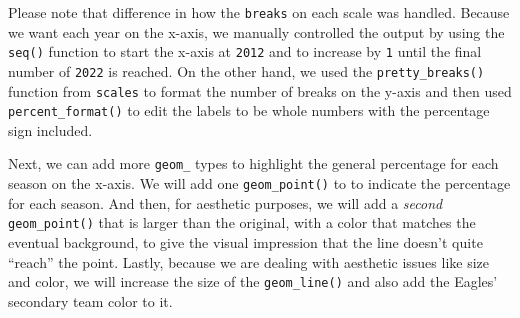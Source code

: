 \documentclass[
  letterpaper,
]{krantz}
\newenvironment{Shaded}{\begin{snugshade}}{\end{snugshade}}
\newcommand{\AttributeTok}[1]{\textcolor[rgb]{0.40,0.45,0.13}{#1}}
\newcommand{\DecValTok}[1]{\textcolor[rgb]{0.68,0.00,0.00}{#1}}
\newcommand{\FunctionTok}[1]{\textcolor[rgb]{0.28,0.35,0.67}{#1}}
\newcommand{\NormalTok}[1]{\textcolor[rgb]{0.00,0.23,0.31}{#1}}
\newcommand{\SpecialCharTok}[1]{\textcolor[rgb]{0.37,0.37,0.37}{#1}}
\newcommand{\StringTok}[1]{\textcolor[rgb]{0.13,0.47,0.30}{#1}}
\begin{document}
Please note that difference in how the \texttt{breaks} on each scale was
handled. Because we want each year on the x-axis, we manually controlled
the output by using the \texttt{seq()} function to start the x-axis at
\texttt{2012} and to increase by \texttt{1} until the final number of
\texttt{2022} is reached. On the other hand, we used the
\texttt{pretty\_breaks()} function from \texttt{scales} to format the
number of breaks on the y-axis and then used \texttt{percent\_format()}
to edit the labels to be whole numbers with the percentage sign
included.

Next, we can add more \texttt{geom\_} types to highlight the general
percentage for each season on the x-axis. We will add one
\texttt{geom\_point()} to to indicate the percentage for each season.
And then, for aesthetic purposes, we will add a \emph{second}
\texttt{geom\_point()} that is larger than the original, with a color
that matches the eventual background, to give the visual impression that
the line doesn't quite ``reach'' the point. Lastly, because we are
dealing with aesthetic issues like size and color, we will increase the
size of the \texttt{geom\_line()} and also add the Eagles' secondary
team color to it.

\begin{Shaded}
\end{Shaded}
\end{document}

